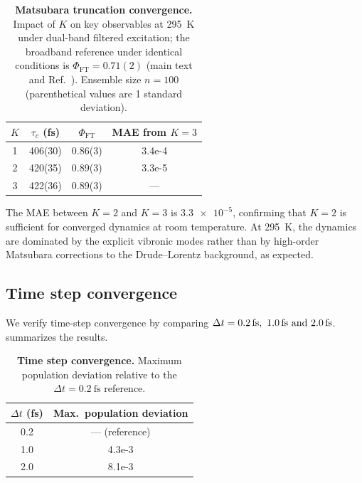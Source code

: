 \documentclass[11pt,a4paper]{article}
\begin{document}
\begin{table}[htbp]
\centering
\caption{\textbf{Matsubara truncation convergence.} Impact of $K$ on key observables at \qty{295}{\kelvin} under dual-band filtered excitation; the broadband reference under identical conditions is $\Phi_{\mathrm{FT}} = 0.71(2)$ (main text and Ref.~\cite{TeguiaKouam2026}). Ensemble size $n=100$ (parenthetical values are 1 standard deviation).}
\label{tab:SI_matsubara_convergence}
\begin{tabular}{S[table-format=1.0, separate-uncertainty=false] S[table-format=3.2(2), separate-uncertainty=false] S[table-format=1.2(1), separate-uncertainty=false] S[table-format=1.1e2, separate-uncertainty=false]}
\toprule
{$K$} & {$\tau_c$ (fs)} & {$\Phi_{\mathrm{FT}}$} & {MAE from $K=3$} \\
 & 406(30) & 0.86(3) & 3.4e-4 \\
2 & 420(35) & 0.89(3) & 3.3e-5 \\
3 & 422(36) & 0.89(3) & {---} \\
\bottomrule
\end{tabular}
\end{table}

The MAE between $K=2$ and $K=3$ is $\num{3.3e-5}$, confirming that $K=2$ is sufficient for converged dynamics at room temperature. At \qty{295}{\kelvin}, the dynamics are dominated by the explicit vibronic modes rather than by high-order Matsubara corrections to the Drude--Lorentz background, as expected.

\subsection{Time step convergence}

We verify time-step convergence by comparing $\Delta t = \qtylist{0.2;1.0;2.0}{\fs}$.  summarizes the results.

\begin{table}[htbp]
\centering
\caption{\textbf{Time step convergence.} Maximum population deviation relative to the $\Delta t = \qty{0.2}{\fs}$ reference.}
\label{tab:SI_timestep_convergence}
\begin{tabular}{S[table-format=1.1] S[table-format=1.1e-1]}
\toprule
{$\Delta t$ (fs)} & {Max.\ population deviation} \\
 & {--- (reference)} \\
1.0 & 4.3e-3 \\
2.0 & 8.1e-3 \\
\bottomrule
\end{tabular}
\end{table}
\end{document}
